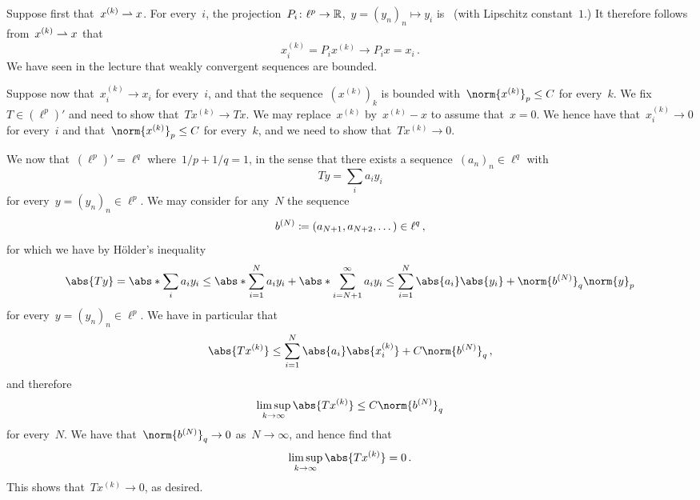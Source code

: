 \section{}





\subsection{}

Suppose first that~$x^{(k)} \rightharpoonup x$.
For every~$i$, the projection~$P_i \colon \ell^p \to \mathbb{R}$,~$y = (y_n)_n \mapsto y_i$ is~{\lipcont} (with Lipschitz constant~$1$.)
It therefore follows from~$x^{(k)} \rightharpoonup x$ that
\[
      x^{(k)}_i
  =   P_i x^{(k)}
  \to P_i x
  =   x_i \,.
\]
We have seen in the lecture that weakly convergent sequences are bounded.

Suppose now that~$x^{(k)}_i \to x_i$ for every~$i$, and that the sequence~$(x^{(k)})_k$ is bounded with~$\norm{x^{(k)}}_p \leq C$ for every~$k$.
We fix~$T \in (\ell^p)'$ and need to show that~$T x^{(k)} \to T x$.
We may replace~$x^{(k)}$ by~$x^{(k)} - x$ to assume that~$x = 0$.
We hence have that~$x^{(k)}_i \to 0$ for every~$i$ and that~$\norm{x^{(k)}}_p \leq C$ for every~$k$, and we need to show that~$T x^{(k)} \to 0$.

We now that~$(\ell^p)' = \ell^q$ where~$1/p + 1/q = 1$, in the sense that there exists a sequence~$(a_n)_n \in \ell^q$ with
\[
    T y
  = \sum_i a_i y_i
\]
for every~$y = (y_n)_n \in \ell^p$.
We may consider for any~$N$ the sequence
\[
  b^{(N)}
  \coloneqq
  (a_{N+1}, a_{N+2}, \dotsc)
  \in
  \ell^q \,,
\]
for which we have by Hölder’s inequality
\[
  \abs{Ty}
  =
  \abs*{ \sum_i a_i y_i }
  \leq
  \abs*{ \sum_{i=1}^N a_i y_i }
  +
  \abs*{ \sum_{i=N+1}^\infty a_i y_i }
  \leq
  \sum_{i=1}^N \abs{a_i} \abs{y_i}
  +
  \norm{ b^{(N)} }_q \norm{y}_p
\]
for every~$y = (y_n)_n \in \ell^p$.
We have in particular that
\[
  \abs{ T x^{(k)} }
  \leq
  \sum_{i=1}^N \abs{a_i} \abs{x^{(k)}_i}
  +
  C \norm{b^{(N)}}_q \,,
\]
and therefore
\[
  \limsup_{k \to \infty} \abs{ T x^{(k)} }
  \leq
  C \norm{b^{(N)}}_q
\]
for every~$N$.
We have that~$\norm{b^{(N)}}_q \to 0$ as~$N \to \infty$, and hence find that
\[
  \limsup_{k \to \infty} \abs{ T x^{(k)} }
  =
  0 \,.
\]
This shows that~$T x^{(k)} \to 0$, as desired.





\subsection{}

